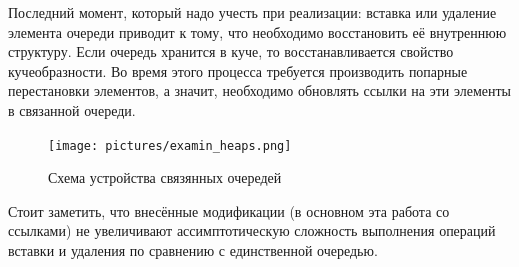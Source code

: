 \par
Последний момент, который надо учесть при реализации: вставка или удаление элемента очереди приводит к тому, что необходимо восстановить её внутреннюю структуру.
Если очередь хранится в куче, то восстанавливается свойство кучеобразности. Во время этого процесса
требуется производить попарные перестановки элементов, а значит, необходимо обновлять ссылки на эти элементы в связанной очереди.
\begin{figure}[ht]
	\center
  \texttt{[image: pictures/examin\_heaps.png]}
  \caption{Схема устройства связянных очередей}
  \label{fig:heaps}
\end{figure}
\par
Стоит заметить, что внесённые модификации (в основном эта работа со ссылками) не увеличивают ассимптотическую сложность выполнения операций вставки и удаления по сравнению с единственной очередью.
